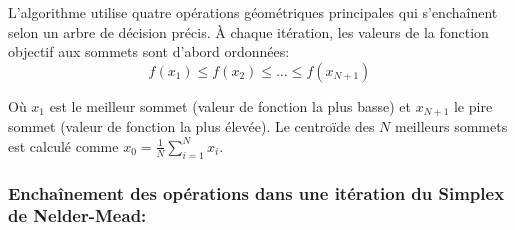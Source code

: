 L'algorithme utilise quatre opérations géométriques principales qui s'enchaînent selon un arbre de décision précis. À chaque itération, les valeurs de la fonction objectif aux sommets sont d'abord ordonnées:
\begin{equation}\label{eq:ordre_simplex}
f(x_1) \leq f(x_2) \leq \ldots \leq f(x_{N+1})
\end{equation}

Où $x_1$ est le meilleur sommet (valeur de fonction la plus basse) et $x_{N+1}$ le pire sommet (valeur de fonction la plus élevée). Le centroïde des $N$ meilleurs sommets est calculé comme $x_0 = \frac{1}{N}\sum_{i=1}^{N}x_i$.

\vspace{1em}

\subsubsection{Enchaînement des opérations dans une itération du Simplex de Nelder-Mead:}

